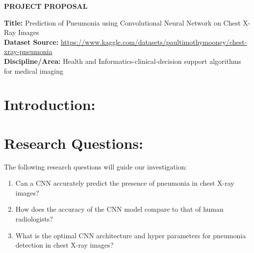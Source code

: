 \documentclass[11pt,a4paper]{article}
\begin{document}


\pagestyle{plain}

\begin{mybox}
\centering \textbf{PROJECT PROPOSAL}
\end{mybox}

\medskip

\textbf{Title:} Prediction of Pneumonia using Convolutional Neural Network on Chest X-Ray Images \\


\textbf{Dataset Source:} \url{https://www.kaggle.com/datasets/paultimothymooney/chest-xray-pneumonia}\\

\textbf{Discipline/Area:} Health and Informatics-clinical-decision support algorithms for medical imaging  

\section*{Introduction: }  \cite {krizhevsky2012imagenet}

\section*{Research Questions:} 
\noindent The following research questions will guide our investigation:

\begin{enumerate}
\item Can a CNN accurately predict the presence of pneumonia in chest X-ray images?
\item How does the accuracy of the CNN model compare to that of human radiologists?
\item What is the optimal CNN architecture and hyper parameters for pneumonia detection in chest X-ray images?
\end{enumerate}
\end{document}
